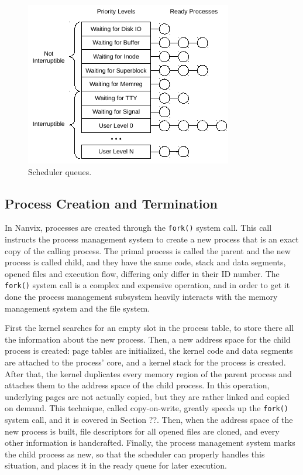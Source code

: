 \documentclass[10pt,a4paper]{article}
\begin{document}
\begin{figure}[t]
	\centering
	\includegraphics[scale=1.4]{img/scheduler}
	\caption{Scheduler queues.}
	\label{figure: scheduler}
\end{figure}

\subsection{Process Creation and Termination}

In Nanvix, processes are created through the \texttt{fork()} system call. This call instructs the process management system to create a new process that is an exact copy of the calling process. The primal process is called the parent and the new process is called child, and they have the same code, stack and data segments, opened files and execution flow, differing only differ in their ID number. The \texttt{fork()} system call is a complex and expensive operation, and in order to get it done the process management subsystem heavily interacts with the memory management system and the file system.

First the kernel searches for an empty slot in the process table, to store there all the information about the new process. Then, a new address space for the child process is created: page tables are initialized, the kernel code and data segments are attached to the process' core, and a kernel stack for the process is created. After that, the kernel duplicates every memory region of the parent process and attaches them to the address space of the child process. In this operation, underlying pages are not actually copied, but they are rather linked and copied on demand. This technique, called copy-on-write, greatly speeds up the \texttt{fork()} system call, and it is covered in Section ??. Then, when the address space of the new process is built, file descriptors for all opened files are cloned, and every other information is handcrafted. Finally, the process management system marks the child process as new, so that the scheduler can properly handles this situation, and places it in the ready queue for later execution.
\end{document}
